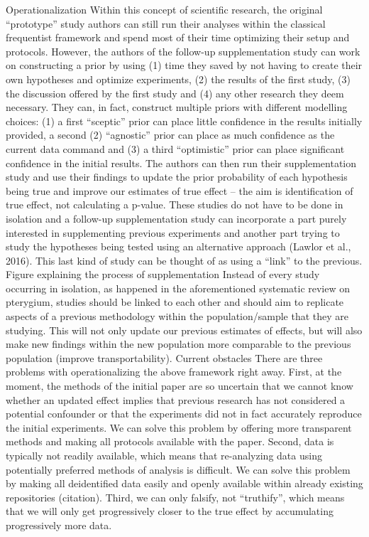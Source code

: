 \documentclass[12pt]{article}
\begin{document}
Operationalization
Within this concept of scientific research, the original “prototype” study authors can still run their analyses within the classical frequentist framework and spend most of their time optimizing their setup and protocols. However, the authors of the follow-up supplementation study can work on constructing a prior by using (1) time they saved by not having to create their own hypotheses and optimize experiments, (2) the results of the first study, (3) the discussion offered by the first study and (4) any other research they deem necessary. They can, in fact, construct multiple priors with different modelling choices: (1) a first “sceptic” prior can place little confidence in the results initially provided, a second (2) “agnostic” prior can place as much confidence as the current data command and (3) a third “optimistic” prior can place significant confidence in the initial results. The authors can then run their supplementation study and use their findings to update the prior probability of each hypothesis being true and improve our estimates of true effect – the aim is identification of true effect, not calculating a p-value. These studies do not have to be done in isolation and a follow-up supplementation study can incorporate a part purely interested in supplementing previous experiments and another part trying to study the hypotheses being tested using an alternative approach (Lawlor et al., 2016). This last kind of study can be thought of as using a “link” to the previous.
Figure explaining the process of supplementation
Instead of every study occurring in isolation, as happened in the aforementioned systematic review on pterygium, studies should be linked to each other and should aim to replicate aspects of a previous methodology within the population/sample that they are studying. This will not only update our previous estimates of effects, but will also make new findings within the new population more comparable to the previous population (improve transportability).
Current obstacles
There are three problems with operationalizing the above framework right away. First, at the moment, the methods of the initial paper are so uncertain that we cannot know whether an updated effect implies that previous research has not considered a potential confounder or that the experiments did not in fact accurately reproduce the initial experiments. We can solve this problem by offering more transparent methods and making all protocols available with the paper. Second, data is typically not readily available, which means that re-analyzing data using potentially preferred methods of analysis is difficult. We can solve this problem by making all deidentified data easily and openly available within already existing repositories (citation). Third, we can only falsify, not “truthify”, which means that we will only get progressively closer to the true effect by accumulating progressively more data.
\end{document}
